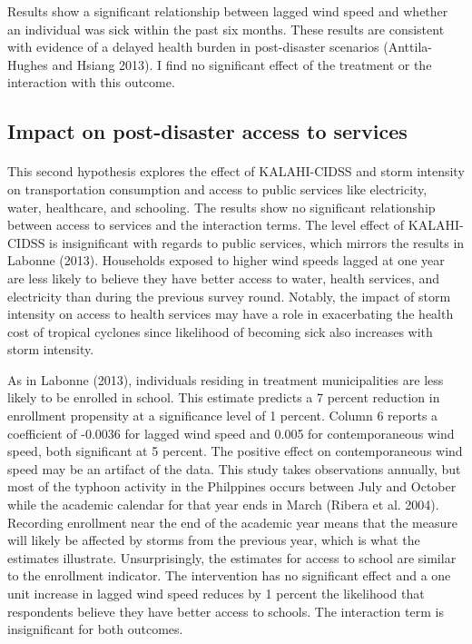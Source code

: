 \documentclass[12pt]{article}
\begin{document}
	Results show a significant relationship between lagged wind speed and whether an individual was sick within the past six months. These results are consistent with evidence of a delayed health burden in post-disaster scenarios (Anttila-Hughes and Hsiang 2013). I find no significant effect of the treatment or the interaction with this outcome. 


	\subsection{Impact on post-disaster access to services}

	\paragraph{ } This second hypothesis explores the effect of KALAHI-CIDSS and storm intensity on transportation consumption and access to public services like electricity, water, healthcare, and schooling. The results show no significant relationship between access to services and the interaction terms. The level effect of KALAHI-CIDSS is insignificant with regards to public services, which mirrors the results in Labonne (2013). Households exposed to higher wind speeds lagged at one year are less likely to believe they have better access to water, health services, and electricity than during the previous survey round. Notably, the impact of storm intensity on access to health services may have a role in exacerbating the health cost of tropical cyclones since likelihood of becoming sick also increases with storm intensity. 

	As in Labonne (2013), individuals residing in treatment municipalities are less likely to be enrolled in school. This estimate predicts a 7 percent reduction in enrollment propensity at a significance level of 1 percent. Column 6 reports a coefficient of -0.0036 for lagged wind speed and 0.005 for contemporaneous wind speed, both significant at 5 percent. The positive effect on contemporaneous wind speed may be an artifact of the data. This study takes observations annually, but most of the typhoon activity in the Philppines occurs between July and October while the academic calendar for that year ends in March (Ribera et al. 2004). Recording enrollment near the end of the academic year means that the measure will likely be affected by storms from the previous year, which is what the estimates illustrate. Unsurprisingly, the estimates for access to school are similar to the enrollment indicator. The intervention has no significant effect and a one unit increase in lagged wind speed reduces by 1 percent the likelihood that respondents believe they have better access to schools. The interaction term is insignificant for both outcomes.
\end{document}
